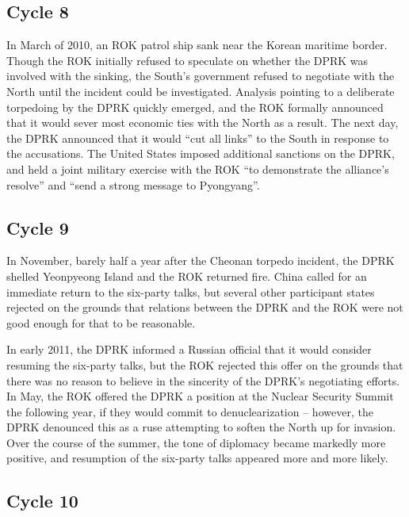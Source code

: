 \documentclass{article}
\begin{document}
\subsection{Cycle 8}

In March of 2010, an ROK patrol ship sank near the Korean maritime border\cite{branigan}. Though the ROK initially refused to speculate on whether the DPRK was involved with the sinking\cite{branigan}, the South’s government refused to negotiate with the North until the incident could be investigated\cite{davenport}. Analysis pointing to a deliberate torpedoing by the DPRK quickly emerged\cite{reuters}, and the ROK formally announced that it would sever most economic ties with the North as a result. The next day, the DPRK announced that it would “cut all links” to the South in response to the accusations\cite{davenport}. The United States imposed additional sanctions on the DPRK, and held a joint military exercise with the ROK “to demonstrate the alliance’s resolve” and “send a strong message to Pyongyang”\cite{starr}.

\subsection{Cycle 9}

In November, barely half a year after the Cheonan torpedo incident, the DPRK shelled Yeonpyeong Island and the ROK returned fire\cite{bbc}. China called for an immediate return to the six-party talks\cite{bbc}, but several other participant states rejected on the grounds that relations between the DPRK and the ROK were not good enough for that to be reasonable\cite{davenport}.

In early 2011, the DPRK informed a Russian official that it would consider resuming the six-party talks, but the ROK rejected this offer on the grounds that there was no reason to believe in the sincerity of the DPRK’s negotiating efforts\cite{davenport}. In May, the ROK offered the DPRK a position at the Nuclear Security Summit the following year, if they would commit to denuclearization – however, the DPRK denounced this as a ruse attempting to soften the North up for invasion\cite{davenport}. Over the course of the summer, the tone of diplomacy became markedly more positive, and resumption of the six-party talks appeared more and more likely\cite{davenport}.

\subsection{Cycle 10}
\end{document}
